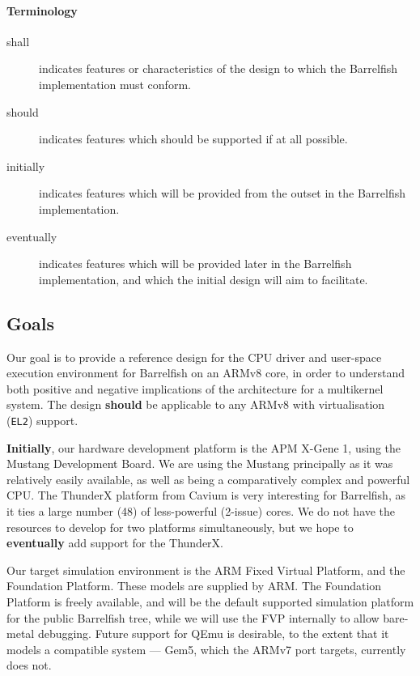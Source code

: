\documentclass[a4paper,twoside]{report}
\begin{document}
\paragraph{Terminology}
\begin{description}
\item[shall]
    indicates features or characteristics of the design to which the
    Barrelfish implementation must conform.
\item[should]
    indicates features which should be supported if at all possible.
\item[initially]
    indicates features which will be provided from the outset in the
    Barrelfish implementation.
\item[eventually]
    indicates features which will be provided later in the Barrelfish
    implementation, and which the initial design will aim to facilitate.
\end{description}

\subsection{Goals}

Our goal is to provide a reference design for the CPU driver and user-space
execution environment for Barrelfish on an ARMv8 core, in order to understand
both positive and negative implications of the architecture for a multikernel
system.  The design \textbf{should} be applicable to any ARMv8 with
virtualisation (\texttt{EL2}) support.

\textbf{Initially}, our hardware development platform is the APM X-Gene 1,
using the Mustang Development Board. We are using the Mustang principally as
it was relatively easily available, as well as being a comparatively complex
and powerful CPU. The ThunderX platform from Cavium is very interesting for
Barrelfish, as it ties a large number (48) of less-powerful (2-issue) cores.
We do not have the resources to develop for two platforms simultaneously, but
we hope to \textbf{eventually} add support for the ThunderX.

Our target simulation environment is the ARM Fixed Virtual Platform, and the
Foundation Platform. These models are supplied by ARM. The Foundation Platform
is freely available, and will be the default supported simulation platform for
the public Barrelfish tree, while we will use the FVP internally to allow
bare-metal debugging. Future support for QEmu is desirable, to the extent that
it models a compatible system --- Gem5, which the ARMv7 port targets,
currently does not.
\end{document}
